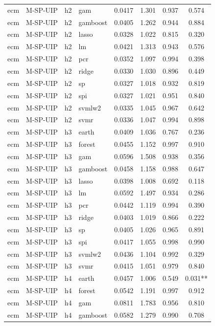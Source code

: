 \begin{ThreePartTable}
\begin{longtable}[t]{llclcccc}
ecm & M-SP-UIP & h2 & gam & 0.0417 & 1.301 & 0.937 & 0.574\\
ecm & M-SP-UIP & h2 & gamboost & 0.0405 & 1.262 & 0.944 & 0.884\\
ecm & M-SP-UIP & h2 & lasso & 0.0328 & 1.022 & 0.815 & 0.320\\
ecm & M-SP-UIP & h2 & lm & 0.0421 & 1.313 & 0.943 & 0.576\\
ecm & M-SP-UIP & h2 & pcr & 0.0352 & 1.097 & 0.994 & 0.398\\
ecm & M-SP-UIP & h2 & ridge & 0.0330 & 1.030 & 0.896 & 0.449\\
ecm & M-SP-UIP & h2 & sp & 0.0327 & 1.018 & 0.932 & 0.819\\
ecm & M-SP-UIP & h2 & spi & 0.0327 & 1.021 & 0.951 & 0.840\\
ecm & M-SP-UIP & h2 & svmlw2 & 0.0335 & 1.045 & 0.967 & 0.642\\
ecm & M-SP-UIP & h2 & svmr & 0.0336 & 1.047 & 0.994 & 0.898\\
\addlinespace
ecm & M-SP-UIP & h3 & earth & 0.0409 & 1.036 & 0.767 & 0.236\\
ecm & M-SP-UIP & h3 & forest & 0.0455 & 1.152 & 0.997 & 0.910\\
ecm & M-SP-UIP & h3 & gam & 0.0596 & 1.508 & 0.938 & 0.356\\
ecm & M-SP-UIP & h3 & gamboost & 0.0458 & 1.158 & 0.988 & 0.647\\
ecm & M-SP-UIP & h3 & lasso & 0.0398 & 1.008 & 0.692 & 0.118\\
ecm & M-SP-UIP & h3 & lm & 0.0592 & 1.497 & 0.934 & 0.286\\
ecm & M-SP-UIP & h3 & pcr & 0.0442 & 1.119 & 0.994 & 0.390\\
ecm & M-SP-UIP & h3 & ridge & 0.0403 & 1.019 & 0.866 & 0.222\\
ecm & M-SP-UIP & h3 & sp & 0.0405 & 1.026 & 0.965 & 0.891\\
ecm & M-SP-UIP & h3 & spi & 0.0417 & 1.055 & 0.998 & 0.990\\
ecm & M-SP-UIP & h3 & svmlw2 & 0.0436 & 1.104 & 0.992 & 0.329\\
ecm & M-SP-UIP & h3 & svmr & 0.0415 & 1.051 & 0.979 & 0.840\\
\addlinespace
ecm & M-SP-UIP & h4 & earth & 0.0457 & 1.006 & 0.549 & 0.031**\\
ecm & M-SP-UIP & h4 & forest & 0.0542 & 1.191 & 0.997 & 0.912\\
ecm & M-SP-UIP & h4 & gam & 0.0811 & 1.783 & 0.956 & 0.810\\
ecm & M-SP-UIP & h4 & gamboost & 0.0582 & 1.279 & 0.990 & 0.708\\

\end{longtable}
\end{ThreePartTable}
